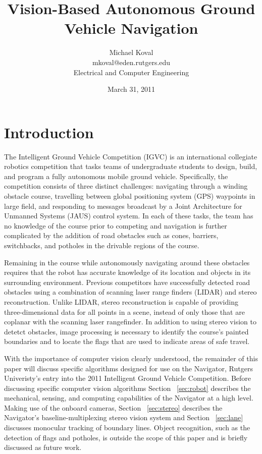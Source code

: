 \documentclass[11pt,twocolumn]{article}
\title{Vision-Based Autonomous Ground Vehicle Navigation}
\date{March 31, 2011}
\author{
	Michael Koval \\
	mkoval@eden.rutgers.edu \\
	Electrical and Computer Engineering
}
\begin{document}
\maketitle

\section{Introduction}
\label{sec:intro}
The Intelligent Ground Vehicle Competition (IGVC) is an international collegiate
robotics competition that tasks teams of undergraduate students to design,
build, and program a fully autonomous mobile ground vehicle. Specifically, the
competition consists of three distinct challenges: navigating through a winding
obstacle course, travelling between global positioning system (GPS) waypoints in
large field, and responding to messages broadcast by a Joint Architecture for
Unmanned Systems (JAUS) control system. In each of these tasks, the team has no
knowledge of the course prior to competing and navigation is further complicated
by the addition of road obstacles such as cones, barriers, switchbacks, and
potholes in the drivable regions of the course.

Remaining in the course while autonomously navigating around these obstacles
requires that the robot has accurate knowledge of its location and objects in
its surrounding environment. Previous competitors have successfully detected
road obstacles using a combination of scanning laser range finders (LIDAR) and
stereo reconstruction. Unlike LIDAR, stereo reconstruction is capable of
providing three-dimensional data for all points in a scene, instead of only
those that are coplanar with the scanning laser rangefinder. In addition to
using stereo vision to detetct obstacles, image processing is necessary to
identify the course's painted boundaries and to locate the flags that are used
to indicate areas of safe travel.

With the importance of computer vision clearly understood, the remainder of this
paper will discuss specific algorithms designed for use on the Navigator,
Rutgers Univeristy's entry into the 2011 Intelligent Ground Vehicle Competition.
Before discussing specific computer vision algorithms Section ~\ref{sec:robot}
describes the mechanical, sensing, and computing capabilities of the Navigator
at a high level. Making use of the onboard cameras, Section ~\ref{sec:stereo}
describes the Navigator's baseline-multiplexing stereo vision system and Section
~\ref{sec:lane} discusses monocular tracking of boundary lines. Object
recognition, such as the detection of flags and potholes, is outside the scope
of this paper and is briefly discussed as future work.
\end{document}
